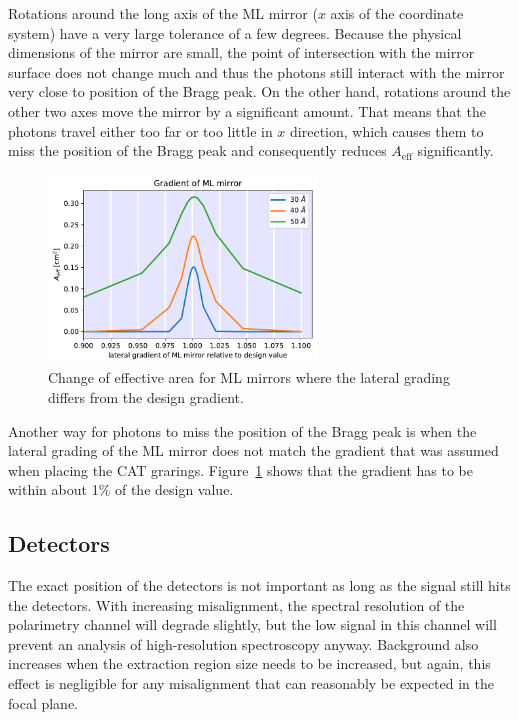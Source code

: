 \documentclass[]{spie}  %
\begin{document}
Rotations around the long axis of the ML mirror ($x$ axis of the
coordinate system) have a very large tolerance of a few
degrees. Because the physical dimensions of the mirror are small, the
point of intersection with the mirror surface does not change much and
thus the photons still interact with the mirror very close to position
of the Bragg peak. On the other hand, rotations around the other two
axes move the mirror by a significant amount. That means that the
photons travel either too far or too little in $x$
direction, which causes them to miss the position of the Bragg peak
and consequently reduces $A_{\mathrm{eff}}$ significantly.

\begin{figure} [ht]
  \begin{center}
    \includegraphics[height=5cm]{LGML_gradient.pdf}
  \end{center}
  \caption
      { \label{fig:LGML_gradient}Change of effective area for ML mirrors where the lateral grading differs from the design gradient.
}
\end{figure}

Another way for photons to miss the position of the Bragg peak is when
the lateral grading of the ML mirror does not match the gradient that
was assumed when placing the CAT
grarings. Figure~\ref{fig:LGML_gradient} shows that the gradient has
to be within about 1\% of the design value.

\subsection{Detectors}
The exact position of the detectors is not important as long as the
signal still hits the detectors. With increasing misalignment, the
spectral resolution of the polarimetry channel will degrade slightly,
but the low signal in this channel will prevent an analysis of
high-resolution spectroscopy anyway. Background also increases
when the extraction region size needs to be increased, but again, this
effect is negligible for any misalignment that can reasonably be
expected in the focal plane.
\end{document}
